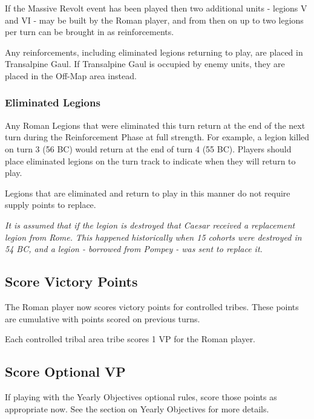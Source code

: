 If the Massive Revolt event has been played then two additional units - legions V and VI - may be built by the Roman player, and from then on up to two legions per turn can be brought in as reinforcements.

Any reinforcements, including eliminated legions returning to play, are placed in Transalpine Gaul. If Transalpine Gaul is occupied by enemy units, they are placed in the Off-Map area instead.

\subsubsection{Eliminated Legions}
\par
Any Roman Legions that were eliminated this turn return at the end of the next turn during the Reinforcement Phase at full strength. For example, a legion killed on turn 3 (56 BC) would return at the end of turn 4 (55 BC). Players should place eliminated legions on the turn track to indicate when they will return to play.

Legions that are eliminated and return to play in this manner do not require supply points to replace.

\textit{It is assumed that if the legion is destroyed that Caesar received a replacement legion from Rome. This happened historically when 15 cohorts were destroyed in 54 BC, and a legion - borrowed from Pompey - was sent to replace it.}

\subsection{Score Victory Points}
\par
The Roman player now scores victory points for controlled tribes. These points are cumulative with points scored on previous turns.

Each controlled tribal area tribe scores 1 VP for the Roman player.

\subsection{Score Optional VP}
If playing with the Yearly Objectives optional rules, score those points as appropriate now. See the section on Yearly Objectives for more details.
